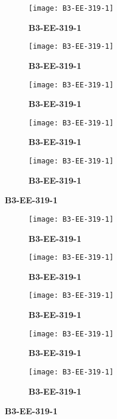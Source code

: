 \documentclass{article}
\begin{document}
\begin{figure}[]
	\centering
	\begin{subfigure}{0.19\textwidth}
		\centering
		\texttt{[image: B3-EE-319-1]}
		\caption*{\large{\textbf{B3-EE-319-1}}}
	\end{subfigure}\hfil
	\begin{subfigure}{0.19\textwidth}
		\centering
		\texttt{[image: B3-EE-319-1]}
		\caption*{\large{\textbf{B3-EE-319-1}}}
	\end{subfigure}\hfil
	\begin{subfigure}{0.19\textwidth}
		\centering
		\texttt{[image: B3-EE-319-1]}
		\caption*{\large{\textbf{B3-EE-319-1}}}
	\end{subfigure}\hfil
	\begin{subfigure}{0.19\textwidth}
		\centering
		\texttt{[image: B3-EE-319-1]}
		\caption*{\large{\textbf{B3-EE-319-1}}}
	\end{subfigure} \hfil
	\begin{subfigure}{0.19\textwidth}
		\centering
		\texttt{[image: B3-EE-319-1]}
		\caption*{\large{\textbf{B3-EE-319-1}}}
	\end{subfigure}
\end{figure}

\begin{figure}[]
	\centering
	\begin{subfigure}{0.19\textwidth}
		\centering
		\texttt{[image: B3-EE-319-1]}
		\caption*{\large{\textbf{B3-EE-319-1}}}
	\end{subfigure}\hfil
	\begin{subfigure}{0.19\textwidth}
		\centering
		\texttt{[image: B3-EE-319-1]}
		\caption*{\large{\textbf{B3-EE-319-1}}}
	\end{subfigure}\hfil
	\begin{subfigure}{0.19\textwidth}
		\centering
		\texttt{[image: B3-EE-319-1]}
		\caption*{\large{\textbf{B3-EE-319-1}}}
	\end{subfigure}\hfil
	\begin{subfigure}{0.19\textwidth}
		\centering
		\texttt{[image: B3-EE-319-1]}
		\caption*{\large{\textbf{B3-EE-319-1}}}
	\end{subfigure} \hfil
	\begin{subfigure}{0.19\textwidth}
		\centering
		\texttt{[image: B3-EE-319-1]}
		\caption*{\large{\textbf{B3-EE-319-1}}}
	\end{subfigure}
\end{figure}
\end{document}
